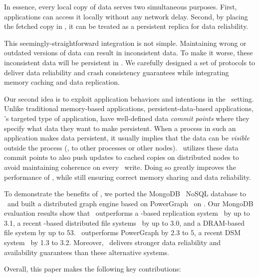 In essence, every local copy of data serves two simultaneous purposes.
First, applications can access it locally without any network delay.
Second, by placing the fetched copy in \nvm, it can be treated as a persistent replica 
for data reliability.

This seemingly-straightforward integration is not simple. 
Maintaining wrong or outdated versions of data can result in inconsistent data.
To make it worse, these inconsistent data will be persistent in \nvm.
We carefully designed a set of protocols to deliver data reliability and crash consistency guarantees 
while integrating memory caching and data replication.

Our second idea is to exploit application behaviors and intentions in the \dsnvm\ setting. 
Unlike traditional memory-based applications, persistent-data-based applications,
\dsnvm's targeted type of application, have well-defined data {\em commit points}
where they specify what data they want to make persistent.
When a process in such an application makes data persistent,
it usually implies that the data can be {\em visible} outside the process (\eg, to other processes or other nodes). 
\hotpot\ utilizes these data commit points to also push updates to cached copies on distributed nodes
to avoid maintaining coherence on every \nvm\ write. %
Doing so greatly improves the performance of \hotpot, 
while still ensuring correct memory sharing and data reliability.

To demonstrate the benefits of \hotpot, we ported the MongoDB~\cite{MongoDB} NoSQL database to \hotpot\
and built a distributed graph engine based on PowerGraph~\cite{Gonzalez12-OSDI} on \hotpot. 
Our MongoDB evaluation results show that \hotpot\ outperforms a \nvm-based replication system~\cite{Zhang15-Mojim} by up to 3.1\x{}, 
a recent \nvm-based distributed file systems~\cite{Octopus} by up to 3.0\x{}, and a DRAM-based file system by up to 53\x{}. 
\hotpot\ outperforms PowerGraph by 2.3\x{} to 5\x{}, a recent DSM system~\cite{Nelson15-ATC} by 1.3\x{} to 3.2\x{}.
Moreover, \hotpot\ delivers stronger data reliability and availability guarantees than these alternative systems.

Overall, this paper makes the following key contributions:

